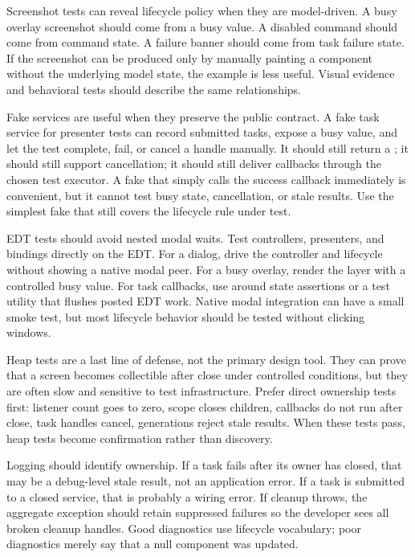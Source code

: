 Screenshot tests can reveal lifecycle policy when they are model-driven. A
busy overlay screenshot should come from a busy value. A disabled command
should come from command state. A failure banner should come from task failure
state. If the screenshot can be produced only by manually painting a component
without the underlying model state, the example is less useful. Visual evidence
and behavioral tests should describe the same relationships.

Fake services are useful when they preserve the public contract. A fake task
service for presenter tests can record submitted tasks, expose a busy value,
and let the test complete, fail, or cancel a handle manually. It should still
return a ; it should still support cancellation; it should
still deliver callbacks through the chosen test executor. A fake that simply
calls the success callback immediately is convenient, but it cannot test busy
state, cancellation, or stale results. Use the simplest fake that still covers
the lifecycle rule under test.

EDT tests should avoid nested modal waits. Test controllers, presenters, and
bindings directly on the EDT. For a dialog, drive the 
controller and lifecycle without showing a native modal peer. For a busy
overlay, render the layer with a controlled busy value. For task callbacks,
use  around state assertions or a test utility that
flushes posted EDT work. Native modal integration can have a small smoke test,
but most lifecycle behavior should be tested without clicking windows.

Heap tests are a last line of defense, not the primary design tool. They can
prove that a screen becomes collectible after close under controlled
conditions, but they are often slow and sensitive to test infrastructure.
Prefer direct ownership tests first: listener count goes to zero, scope closes
children, callbacks do not run after close, task handles cancel, generations
reject stale results. When these tests pass, heap tests become confirmation
rather than discovery.

Logging should identify ownership. If a task fails after its owner has closed,
that may be a debug-level stale result, not an application error. If a task is
submitted to a closed service, that is probably a wiring error. If cleanup
throws, the aggregate exception should retain suppressed failures so the
developer sees all broken cleanup handles. Good diagnostics use lifecycle
vocabulary; poor diagnostics merely say that a null component was updated.

